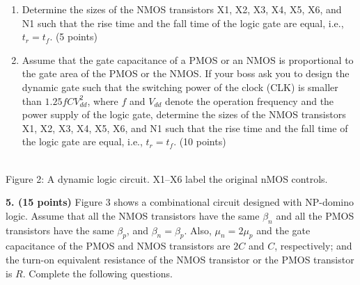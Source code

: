 \documentclass[10pt]{article}
\newcommand{\mos}[4]{\begin{scope}[shift={(#1,#2)}]
\draw(0,.24)--(0,-.24);\draw(0,.2)--(.25,.2)--(.25,.5);\draw(0,-.2)--(.25,-.2)--(.25,-.5);
\draw(-.16,.23)--(-.16,-.23);
\ifnum#4=1\draw(-.26,0)circle(.06);\draw(-.75,0)--(-.32,0);\else\draw(-.75,0)--(-.16,0);\fi
\node[anchor=east,font=\scriptsize]at(-.76,0){$#3$};\end{scope}}
\newcommand{\gnd}[2]{\draw(#1,#2)--(#1,{#2-.12});\draw({#1-.17},{#2-.12})--({#1+.17},{#2-.12});\draw({#1-.11},{#2-.2})--({#1+.11},{#2-.2});}
\newcommand{\rail}[3]{\draw(#1,#2)--(#1,{#2+.14});\node[above,font=\scriptsize]at(#1,{#2+.14}){$#3$};}
\begin{document}
\begin{enumerate}[label=(\alph*)]
\item Determine the sizes of the NMOS transistors X1, X2, X3, X4, X5, X6, and N1 such that the rise time and the fall time of the logic gate are equal, i.e., $t_r=t_f$. (5 points)
\item Assume that the gate capacitance of a PMOS or an NMOS is proportional to the gate area of the PMOS or the NMOS. If your boss ask you to design the dynamic gate such that the switching power of the clock (CLK) is smaller than $1.25fCV_{dd}^2$, where $f$ and $V_{dd}$ denote the operation frequency and the power supply of the logic gate, determine the sizes of the NMOS transistors X1, X2, X3, X4, X5, X6, and N1 such that the rise time and the fall time of the logic gate are equal, i.e., $t_r=t_f$. (10 points)
\end{enumerate}\begin{center}\\Figure 2: A dynamic logic circuit. X1--X6 label the original nMOS controls.\end{center}\newpage\textbf{5. (15 points)} Figure 3 shows a combinational circuit designed with NP-domino logic. Assume that all the NMOS transistors have the same $\beta_n$ and all the PMOS transistors have the same $\beta_p$, and $\beta_n=\beta_p$. Also, $\mu_n=2\mu_p$ and the gate capacitance of the PMOS and NMOS transistors are $2C$ and $C$, respectively; and the turn-on equivalent resistance of the NMOS transistor or the PMOS transistor is $R$. Complete the following questions.
\end{document}
